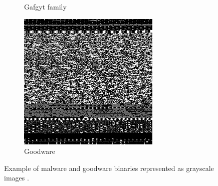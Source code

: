 \documentclass[conference, 11pt]{IEEEtran}
\begin{document}
\begin{figure}[htbp]
\begin{subfigure}{0.31\textwidth}
            \caption{Gafgyt family}
            \label{fig2b}
        \end{subfigure}%
        \hspace*{\fill}
        \begin{subfigure}{0.31\textwidth}
            \centerline{\includegraphics[width=\linewidth]{figures/goodware.png}}
            \caption{Goodware}
            \label{fig2c}
        \end{subfigure}%
        \caption{Example of malware and goodware binaries represented as grayscale images \cite{article:7}.}
        \label{fig2}
    \end{figure}
\end{document}
